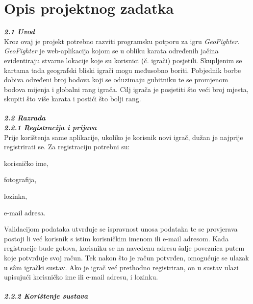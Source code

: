 \chapter{Opis projektnog zadatka}
		
		\textbf{\textit{\large 2.1 Uvod}}\\
		
		{Kroz ovaj je projekt potrebno razviti programsku potporu za igru  \emph{GeoFighter}. \emph{GeoFighter} je web-aplikacija kojom se u obliku karata određenih jačina evidentiraju stvarne lokacije koje su korisnici (č. igrači) posjetili. Skupljenim se kartama tada geografski bliski igrači mogu međusobno boriti. Pobjednik borbe dobiva određeni broj bodova koji se oduzimaju gubitniku te se promjenom bodova mijenja i globalni rang igrača. Cilj igrača je posjetiti što veći broj mjesta, skupiti što više karata i postići što bolji rang. } \\ \\
		
		
		\textbf{\textit{\large 2.2 Razrada }}\\ 
		
		\textbf{\textit{2.2.1 Registracija i prijava }}\\
		
		{Prije korištenja same aplikacije, ukoliko je korisnik novi igrač, dužan je najprije registrirati se. Za registraciju potrebni su:
		}
	
		\begin{packed_item}
			\item {korisničko ime,}
			\item {fotografija,}
			\item {lozinka,}
			\item {e-mail adresa.}
		\end{packed_item}
		
		{Validacijom podataka utvrđuje se ispravnost unosa podataka te se provjerava postoji li već korisnik s istim korisničkim imenom ili e-mail adresom. Kada registracije bude gotova, korisniku se na navedenu adresu šalje poveznica putem koje potvrđuje svoj račun. Tek nakon što je račun potvrđen, omogućuje se ulazak u sâm igrački sustav.}
		{Ako je igrač već prethodno registriran, on u sustav ulazi upisujući korisničko ime ili e-mail adresu, i lozinku.}\\ \\
		
		\textbf{\textit{2.2.2 Korištenje sustava}}\\
		
